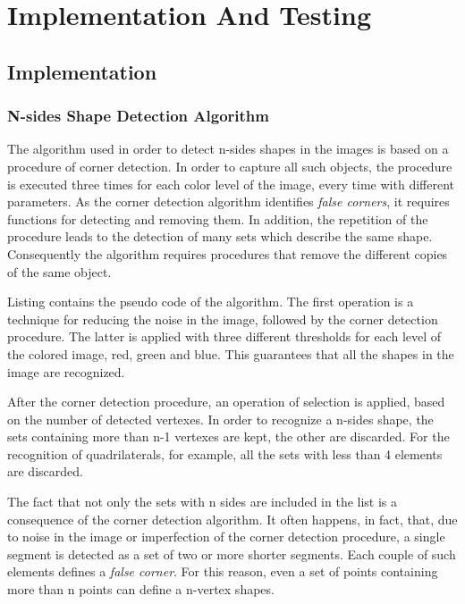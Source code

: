 \chapter{Implementation And Testing}\label{impl_test}
	
	\section{Implementation}
	
		\subsection{N-sides Shape Detection Algorithm}
		The algorithm used in order to detect n-sides shapes in the images is based on a procedure of corner detection. 
		In order to capture all such objects, the procedure is executed three times for each color level of the image, every time with different parameters.
		As the corner detection algorithm identifies \emph{false corners}, it requires functions for detecting and removing them. 
		In addition, the repetition of the procedure leads to the detection of many sets which describe the same shape.	
		Consequently the algorithm requires procedures that remove the different copies of the same object.


		
		Listing \todo{} contains the pseudo code of the algorithm.
		The first operation is a technique for reducing the noise in the image, followed by the corner detection procedure.
		The latter is applied with three different thresholds for each level of the colored image, red, green and blue.
		This guarantees that all the shapes in the image are recognized.
		


		After the corner detection procedure, an operation of selection is applied, based on the number of detected vertexes.
		In order to recognize a n-sides shape, the sets containing more than n-1 vertexes are kept, the other are discarded.
		For the recognition of quadrilaterals, for example, all the sets with less than 4 elements are discarded.
		


		The fact that not only the sets with n sides are included in the list is a consequence of the corner detection algorithm. 
		It often happens, in fact, that, due to noise in the image or imperfection of the corner detection procedure, a single segment is detected as a set of two or more shorter segments. 
		Each couple of such elements defines a \emph{false corner}. 
		For this reason, even a set of points containing more than n points can define a n-vertex shapes. 
		


